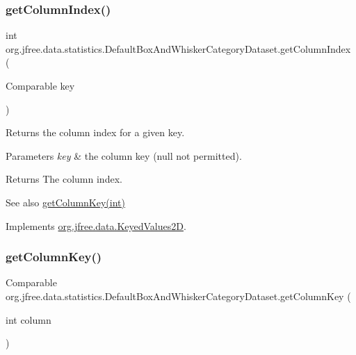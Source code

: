 \subsubsection{\texorpdfstring{get\+Column\+Index()}{getColumnIndex()}}
{\footnotesize\ttfamily int org.\+jfree.\+data.\+statistics.\+Default\+Box\+And\+Whisker\+Category\+Dataset.\+get\+Column\+Index (\begin{DoxyParamCaption}\item[{Comparable}]{key }\end{DoxyParamCaption})}

Returns the column index for a given key.


\begin{DoxyParams}{Parameters}
{\em key} & the column key ({\ttfamily null} not permitted).\\
\hline
\end{DoxyParams}
\begin{DoxyReturn}{Returns}
The column index.
\end{DoxyReturn}
\begin{DoxySeeAlso}{See also}
\mbox{\hyperlink{classorg_1_1jfree_1_1data_1_1statistics_1_1_default_box_and_whisker_category_dataset_aac3ec96693b12a73f35a21e81a0998b9}{get\+Column\+Key(int)}} 
\end{DoxySeeAlso}


Implements \mbox{\hyperlink{interfaceorg_1_1jfree_1_1data_1_1_keyed_values2_d_a3360f2f612f16e8c90409d65e3992d38}{org.\+jfree.\+data.\+Keyed\+Values2D}}.

\mbox{\label{classorg_1_1jfree_1_1data_1_1statistics_1_1_default_box_and_whisker_category_dataset_aac3ec96693b12a73f35a21e81a0998b9}} 
\subsubsection{\texorpdfstring{get\+Column\+Key()}{getColumnKey()}}
{\footnotesize\ttfamily Comparable org.\+jfree.\+data.\+statistics.\+Default\+Box\+And\+Whisker\+Category\+Dataset.\+get\+Column\+Key (\begin{DoxyParamCaption}\item[{int}]{column }\end{DoxyParamCaption})}

